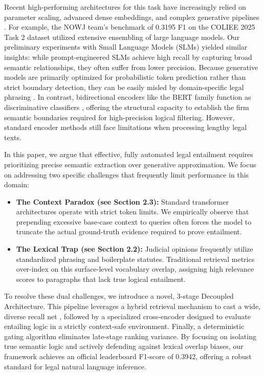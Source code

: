 \documentclass[sigconf]{acmart}
\newcommand{\rev}[1]{{\color{blue}#1}}
\begin{document}
Recent high-performing architectures for this task have increasingly relied on parameter scaling, advanced dense embeddings, and complex generative pipelines \cite{li2025kalm, li2026lexentail}. For example, the \rev{NOWJ team's benchmark of 0.3195 F1 \cite{nguyen2024nowj} on the COLIEE 2025 Task 2 dataset} utilized extensive ensembling of large language models. Our preliminary experiments with Small Language Models (SLMs) yielded similar insights: while prompt-engineered SLMs achieve high recall by capturing broad semantic relationships, they often suffer from lower precision. Because generative models are primarily optimized for probabilistic token prediction rather than strict boundary detection, they can be easily misled by domain-specific legal phrasing \cite{mishra2025investigating}. In contrast, bidirectional encoders like the BERT family function as discriminative classifiers \cite{nogueira2019passage}, offering the structural capacity to establish the firm semantic boundaries required for high-precision logical filtering. However, standard encoder methods still face limitations when processing lengthy legal texts.

In this paper, we argue that effective, fully automated legal entailment requires prioritizing precise semantic extraction over generative approximation. We focus on addressing two specific challenges that frequently limit performance in this domain:
\begin{itemize}
    \item \textbf{The Context Paradox (see Section 2.3):} Standard transformer architectures operate with strict token limits. We empirically observe that prepending excessive base-case context to queries often forces the model to truncate the actual ground-truth evidence required to prove entailment.
    \item \textbf{The Lexical Trap (see Section 2.2):} Judicial opinions frequently utilize standardized phrasing and boilerplate statutes. Traditional retrieval metrics over-index on this surface-level vocabulary overlap, assigning high relevance scores to paragraphs that lack true logical entailment.
\end{itemize}

To resolve these dual challenges, we introduce a novel, 3-stage Decoupled Architecture. This pipeline leverages a hybrid retrieval mechanism to cast a wide, diverse recall net \cite{kiyohara2025off}, followed by a specialized cross-encoder designed to evaluate entailing logic in a strictly context-safe environment. Finally, a deterministic gating algorithm eliminates late-stage ranking variance. By focusing on isolating true semantic logic and actively defending against lexical overlap biases, our framework achieves an official leaderboard F1-score of 0.3942, offering a robust standard for legal natural language inference.
\end{document}

